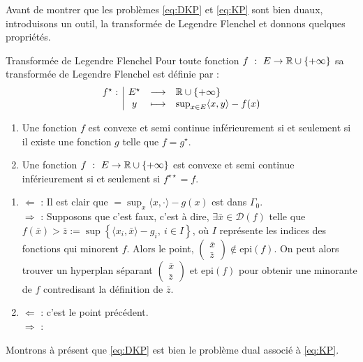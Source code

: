\documentclass[a4paper,12pt]{article}
\begin{document}
Avant de montrer que les problèmes \eqref{eq:DKP} et \eqref{eq:KP} sont bien duaux, introduisons un outil, la transformée de Legendre Flenchel et donnons quelques propriétés. 
\begin{definition}{Transformée de Legendre Flenchel}
Pour toute fonction $f\ :\ E\rightarrow \mathbb{R}\cup\{+\infty\}$ sa transformée de Legendre Flenchel est définie par :
\begin{align}
\begin{array}[t]{l|ccl} f^{\star}: & E^{\star} & \longrightarrow &  \mathbb{R}\cup\{+\infty\} \\ & y & \longmapsto & \sup_{x\in E}\langle x,y\rangle -f(x) \end{array}
\end{align}
\end{definition}
\begin{propriete}
\begin{enumerate}
\item Une fonction $f$ est convexe et semi continue inférieurement si et seulement si il existe une fonction $g$ telle que $f=g^{\star}$.
\item Une fonction $f\ :\ E\rightarrow \mathbb{R}\cup\{+\infty\}$ est convexe et semi continue inférieurement si et seulement si $f^{\star\star}=f$.
\end{enumerate}
\end{propriete}
\begin{preuve}
\begin{enumerate}
\item $\Longleftarrow$ : Il est clair que $=\sup_x \langle x,\cdot \rangle -g(x)$ est dans $\Gamma_0$. \\
$\Longrightarrow$ : Supposons que c'est faux, c'est à dire, $\exists \bar{x}\in\mathcal{D}(f)$ telle que $f(\bar{x})>\bar{z}:=\sup\left\{\langle x_i,\bar{x}\rangle - g_i,\ i\in I\right\}$, où $I$ représente les indices des fonctions qui minorent $f$. Alors le point, $\begin{pmatrix}
\bar{x}\\
\bar{z}
\end{pmatrix}\notin \text{epi}(f)$. On peut alors trouver un hyperplan séparant $\begin{pmatrix}
\bar{x}\\
\bar{z}
\end{pmatrix}$ et $\text{epi}(f)$ pour obtenir une minorante de $f$ contredisant la définition de $\bar{z}$.
\item $\Longleftarrow$ : c'est le point précédent.\\
 $\Longrightarrow$ : 
\end{enumerate}
\end{preuve}
Montrons à présent que \eqref{eq:DKP} est bien le problème dual associé à \eqref{eq:KP}. 
\end{document}
